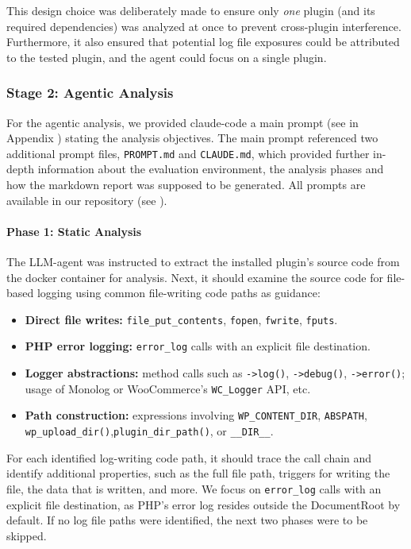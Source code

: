 \documentclass[sigconf]{acmart}
\begin{document}
This design choice was deliberately made to ensure only \emph{one} plugin (and its required dependencies) was analyzed at once to prevent cross-plugin interference. 
Furthermore, it also ensured that potential log file exposures could be attributed to the tested plugin, and the agent could focus on a single plugin.

\subsubsection{Stage 2: Agentic Analysis}
For the agentic analysis, we provided claude-code a main prompt (see  in Appendix ) stating the analysis objectives. 
The main prompt referenced two additional prompt files, \texttt{PROMPT.md} and \texttt{CLAUDE.md}, which provided further in-depth information about the evaluation environment, the analysis phases and how the markdown report was supposed to be generated. 
All prompts are available in our repository (see ).

\paragraph{Phase 1: Static Analysis}
The LLM-agent was instructed to extract the installed plugin's source code from the docker container for analysis.
Next, it should examine the source code for file-based logging using common file-writing code paths as guidance:
\pagebreak
\begin{itemize}
  \item \textbf{Direct file writes:}
        \texttt{file\_put\_contents}, \texttt{fopen}, \texttt{fwrite},
        \texttt{fputs}.
  \item \textbf{PHP error logging:}
        \texttt{error\_log} calls with an explicit file destination.
  \item \textbf{Logger abstractions:}
        method calls such as \texttt{->log()}, \texttt{->debug()},
        \texttt{->error()}; usage of Monolog or WooCommerce's \texttt{WC\_Logger} API, etc.
  \item \textbf{Path construction:}
        expressions involving \texttt{WP\_CONTENT\_DIR}, \texttt{ABSPATH},\\
        \texttt{wp\_upload\_dir()},\texttt{plugin\_dir\_path()},
        or \texttt{\_\_DIR\_\_}.
\end{itemize}
For each identified log-writing code path, it should trace the call chain and identify additional properties, such as the full file path, triggers for writing the file, the data that is written, and more.
We focus on \texttt{error\_log} calls with an explicit file destination, as PHP's error log resides outside the DocumentRoot by default. 
If no log file paths were identified, the next two phases were to be skipped.
\end{document}
